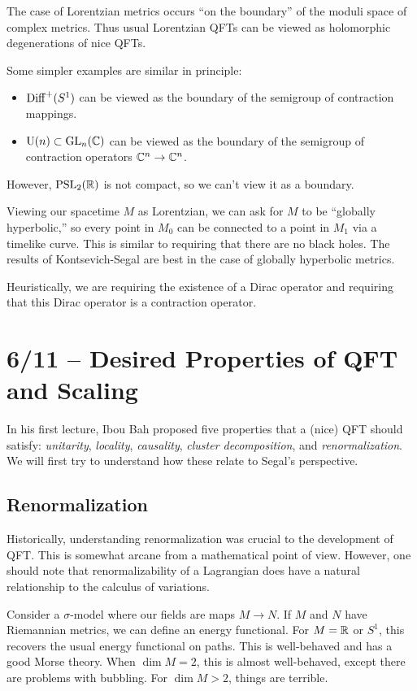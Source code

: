 The case of Lorentzian metrics occurs ``on the boundary'' of the moduli space of complex metrics.
Thus usual Lorentzian QFTs can be viewed as holomorphic degenerations of nice QFTs.

Some simpler examples are similar in principle:
\begin{itemize}
	\item $\operatorname{Diff}^+(S^1)$ can be viewed as the boundary of the semigroup of contraction mappings.
	\item $\mathrm{U}(n) \subset \mathrm{GL}_n(\mathbb{C})$ can be viewed as the boundary of the semigroup of contraction operators $\mathbb{C}^n \to \mathbb{C}^n$.
\end{itemize}

However, $\mathrm{PSL}_2(\mathbb{R})$ is not compact, so we can't view it as a boundary.

Viewing our spacetime $M$ as Lorentzian, we can ask for $M$ to be ``globally hyperbolic,'' so every point in $M_0$ can be connected to a point in $M_1$ via a timelike curve.
This is similar to requiring that there are no black holes.
The results of Kontsevich-Segal are best in the case of globally hyperbolic metrics.

Heuristically, we are requiring the existence of a Dirac operator and requiring that this Dirac operator is a contraction operator.

\section{6/11 -- Desired Properties of QFT and Scaling}

In his first lecture, Ibou Bah proposed five properties that a (nice) QFT should satisfy: \emph{unitarity}, \emph{locality}, \emph{causality}, \emph{cluster decomposition}, and \emph{renormalization}.
We will first try to understand how these relate to Segal's perspective.

\subsection{Renormalization}

Historically, understanding renormalization was crucial to the development of QFT.
This is somewhat arcane from a mathematical point of view.
However, one should note that renormalizability of a Lagrangian does have a natural relationship to the calculus of variations.

Consider a $\sigma$-model where our fields are maps $M \to N$.
If $M$ and $N$ have Riemannian metrics, we can define an energy functional.
For $M = \mathbb{R}$ or $S^1$, this recovers the usual energy functional on paths.
This is well-behaved and has a good Morse theory.
When $\dim M = 2$, this is almost well-behaved, except there are problems with bubbling.
For $\dim M > 2$, things are terrible.


